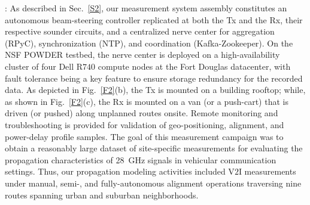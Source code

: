 \documentclass[10pt, twocolumn]{IEEEtran}
\begin{document}
: As described in Sec.~\ref{S2}, our measurement system assembly constitutes an autonomous beam-steering controller replicated at both the Tx and the Rx, their respective sounder circuits, and a centralized nerve center for aggregation (RPyC), synchronization (NTP), and coordination (Kafka-Zookeeper). On the NSF POWDER testbed, the nerve center is deployed on a high-availability cluster of four Dell R$740$ compute nodes at the Fort Douglas datacenter, with fault tolerance being a key feature to ensure storage redundancy for the recorded data. As depicted in Fig.~\ref{F2}(b), the Tx is mounted on a building rooftop; while, as shown in Fig.~\ref{F2}(c), the Rx is mounted on a van (or a push-cart) that is driven (or pushed) along unplanned routes onsite. Remote monitoring and troubleshooting is provided for validation of geo-positioning, alignment, and power-delay profile samples. The goal of this measurement campaign was to obtain a reasonably large dataset of site-specific measurements for evaluating the propagation characteristics of \SI{28}{\giga\hertz} signals in vehicular communication settings. Thus, our propagation modeling activities included V$2$I measurements under manual, semi-, and fully-autonomous alignment operations traversing nine routes spanning urban and suburban neighborhoods.
\end{document}
